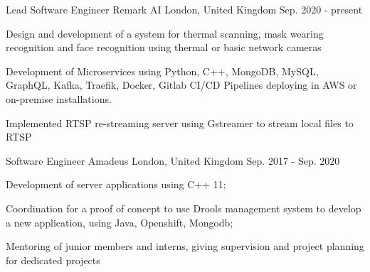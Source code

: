 

\begin{cventries}

   \cventry
    {Lead Software Engineer} %
    {Remark AI} %
    {London,  United Kingdom} %
    {Sep. 2020 - present} %
    {
      \begin{cvitems} %
        \item {Design and development of a system for thermal scanning,
        mask wearing recognition and face recognition using thermal or basic network cameras}
        \item {Development of Microservices using Python, C++, MongoDB, MySQL, GraphQL, Kafka,
        Traefik, Docker, Gitlab CI/CD Pipelines deploying in AWS or on-premise installations.}
        \item {Implemented RTSP re-streaming server using Gstreamer to stream local files to RTSP}
      \end{cvitems}
    }

    \cventry
    {Software Engineer} %
    {Amadeus} %
    {London,  United Kingdom} %
    {Sep. 2017 - Sep. 2020} %
    {
      \begin{cvitems} %
        \item {Development of server applications using C++ 11;}
        \item {Coordination for a proof of concept to use Drools management
        system to develop a new application, using Java, Openshift, Mongodb;}
        \item {Mentoring of junior members and interns, giving supervision and project planning for dedicated projects}
      \end{cvitems}
    }


\end{cventries}
